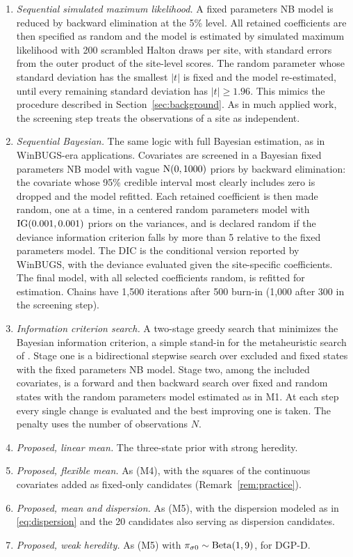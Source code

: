\begin{enumerate}[label=(M\arabic*),leftmargin=*]
\item \emph{Sequential simulated maximum likelihood.} A fixed parameters NB model is reduced by backward elimination at the 5\% level. All retained coefficients are then specified as random and the model is estimated by simulated maximum likelihood with 200 scrambled Halton draws per site, with standard errors from the outer product of the site-level scores. The random parameter whose standard deviation has the smallest $|t|$ is fixed and the model re-estimated, until every remaining standard deviation has $|t|\ge1.96$. This mimics the procedure described in Section~\ref{sec:background}. As in much applied work, the screening step treats the observations of a site as independent.
\item \emph{Sequential Bayesian.} The same logic with full Bayesian estimation, as in WinBUGS-era applications. Covariates are screened in a Bayesian fixed parameters NB model with vague $\mathrm{N}(0,1000)$ priors by backward elimination: the covariate whose 95\% credible interval most clearly includes zero is dropped and the model refitted. Each retained coefficient is then made random, one at a time, in a centered random parameters model with $\mathrm{IG}(0.001,0.001)$ priors on the variances, and is declared random if the deviance information criterion \citep{spiegelhalter2002bayesian} falls by more than 5 relative to the fixed parameters model. The DIC is the conditional version reported by WinBUGS, with the deviance evaluated given the site-specific coefficients. The final model, with all selected coefficients random, is refitted for estimation. Chains have 1{,}500 iterations after 500 burn-in (1{,}000 after 300 in the screening step).
\item \emph{Information criterion search.} A two-stage greedy search that minimizes the Bayesian information criterion, a simple stand-in for the metaheuristic search of \citet{ahern2024extensive}. Stage one is a bidirectional stepwise search over excluded and fixed states with the fixed parameters NB model. Stage two, among the included covariates, is a forward and then backward search over fixed and random states with the random parameters model estimated as in M1. At each step every single change is evaluated and the best improving one is taken. The penalty uses the number of observations $N$.
\item \emph{Proposed, linear mean.} The three-state prior with strong heredity.
\item \emph{Proposed, flexible mean.} As (M4), with the squares of the continuous covariates added as fixed-only candidates (Remark~\ref{rem:practice}).
\item \emph{Proposed, mean and dispersion.} As (M5), with the dispersion modeled as in \eqref{eq:dispersion} and the 20 candidates also serving as dispersion candidates.
\item \emph{Proposed, weak heredity.} As (M5) with $\pi_{\sigma0}\sim\mathrm{Beta}(1,9)$, for DGP-D. 
\end{enumerate}
